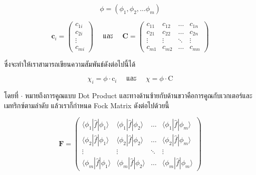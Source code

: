 \begin{equation}
    \phi
    =
    \left(\phi_1, \phi_2, \dots \phi_m\right)
\end{equation}

\begin{equation}
    \bm{c}_i
    = \left(
    \begin{array}{c}
            c_{1 i} \\
            c_{2 i} \\
            \vdots  \\
            c_{m i}
        \end{array}
    \right)
    \quad \text{ และ } \quad
    \bm{C}
    = \left(
    \begin{array}{cccc}
            c_{11}  & c_{12}  & \ldots & c_{1 n} \\
            c_{21}  & c_{22}  & \ldots & c_{2 n} \\
            \vdots  & \vdots  & \ddots & \vdots  \\
            c_{m 1} & c_{m 2} & \ldots & c_{m n}
        \end{array}
    \right)
\end{equation}

\noindent ซึ่งจะทำให้เราสามารถเขียนความสัมพันธ์ดังต่อไปนี้ได้

\begin{equation}
    \chi_i = \phi \cdot \mathrm{c}_i
    \quad \text{ และ } \quad
    \chi = \phi \cdot \mathrm{C}
\end{equation}

\noindent โดยที่ $\cdot$ หมายถึงการคูณแบบ Dot Product และทางด้านซ้ายกับด้านขวาคือการคูณกับเวกเตอร์และเมทริกซ์ตามลำดับ
แล้วเราก็กำหนด Fock Matrix ดังต่อไปด้วยนี้

\begin{equation}
    \bm{F}
    = \left(
    \begin{array}{cccc}
            \langle\phi_1|\hat{f}| \phi_1\rangle & \langle\phi_1|\hat{f}| \phi_2\rangle &
            \ldots                               & \langle\phi_1|\hat{f}| \phi_m\rangle                   \\
            \langle\phi_2|\hat{f}| \phi_1\rangle & \langle\phi_2|\hat{f}| \phi_2\rangle &
            \ldots                               & \langle\phi_2|\hat{f}| \phi_m\rangle                   \\
            \vdots                               & \vdots                               & \ddots & \vdots \\
            \langle\phi_m|\hat{f}| \phi_1\rangle & \langle\phi_m|\hat{f}| \phi_2\rangle &
            \ldots                               & \langle\phi_m|\hat{f}| \phi_m\rangle
        \end{array}
    \right)
\end{equation}

